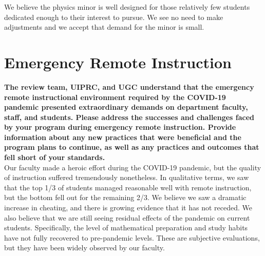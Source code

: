 \documentclass[12pt]{article}
\begin{document}
We believe the physics minor is well designed for those relatively few
students dedicated enough to their interest to pursue.  We see no need
to make adjustments and we accept that demand for the minor is small.

\newpage
\section{Emergency Remote Instruction}
\label{sec:remote}

{\bf The review team, UIPRC, and UGC understand that the emergency remote
instructional environment required by the COVID-19 pandemic presented
extraordinary demands on department faculty, staff, and
students. Please address the successes and challenges faced by your
program during emergency remote instruction. Provide information about
any new practices that were beneficial and the program plans to
continue, as well as any practices and outcomes that fell short of
your standards.}\\[3pt]


\noindent
Our faculty made a heroic effort during the COVID-19 pandemic, but the
quality of instruction suffered tremendously nonetheless.  In
qualitative terms, we saw that the top 1/3 of students managed
reasonable well with remote instruction, but the bottom fell out for
the remaining 2/3.  We believe we saw a dramatic increase in cheating,
and there is growing evidence that it has not receded.  We also
believe that we are still seeing residual effects of the pandemic on
current students.  Specifically, the level of mathematical preparation
and study habits have not fully recovered to pre-pandemic levels.
These are subjective evaluations, but they have been widely observed
by our faculty.
\end{document}
